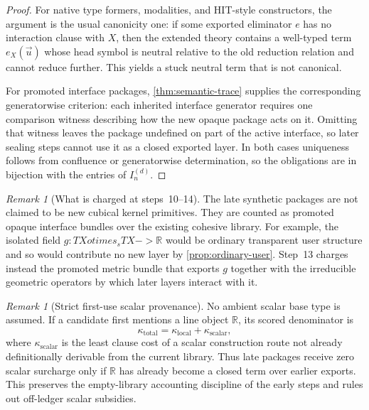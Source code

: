 \documentclass[11pt,a4paper]{article}
\def\to{->}%
\def\otimes{otimes}%
\theoremstyle{plain}
\theoremstyle{definition}
\theoremstyle{remark}
\newtheorem{remark}[theorem]{Remark}
\newcommand{\R}{\mathbb{R}}
\begin{document}
\begin{proof}
For native type formers, modalities, and HIT-style constructors, the argument is the usual canonicity one: if some exported eliminator $e$ has no interaction clause with $X$, then the extended theory contains a well-typed term $e_X(\vec u)$ whose head symbol is neutral relative to the old reduction relation and cannot reduce further.  This yields a stuck neutral term that is not canonical.

For promoted interface packages, \cref{thm:semantic-trace} supplies the corresponding generatorwise criterion: each inherited interface generator requires one comparison witness describing how the new opaque package acts on it.  Omitting that witness leaves the package undefined on part of the active interface, so later sealing steps cannot use it as a closed exported layer.  In both cases uniqueness follows from confluence or generatorwise determination, so the obligations are in bijection with the entries of $I_n^{(d)}$.
\end{proof}

\begin{remark}[What is charged at steps~10--14]
\label{rem:late-packages}
The late synthetic packages are not claimed to be new cubical kernel primitives.  They are counted as promoted opaque interface bundles over the existing cohesive library.  For example, the isolated field $g:TX\otimes_s TX\to\R$ would be ordinary transparent user structure and so would contribute no new layer by \cref{prop:ordinary-user}.  Step~13 charges instead the promoted metric bundle that exports $g$ together with the irreducible geometric operators by which later layers interact with it.
\end{remark}

\begin{remark}[Strict first-use scalar provenance]
\label{rem:scalar-provenance}
No ambient scalar base type is assumed.  If a candidate first mentions a line object $\R$, its scored denominator is
\[
  \kappa_{\mathrm{total}}=\kappa_{\mathrm{local}}+\kappa_{\mathrm{scalar}},
\]
where $\kappa_{\mathrm{scalar}}$ is the least clause cost of a scalar construction route not already definitionally derivable from the current library.  Thus late packages receive zero scalar surcharge only if $\R$ has already become a closed term over earlier exports.  This preserves the empty-library accounting discipline of the early steps and rules out off-ledger scalar subsidies.
\end{remark}
\end{document}
